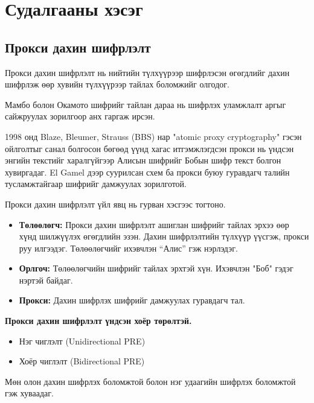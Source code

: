 
\chapter{Судалгааны хэсэг}
\label{Chapter2} %
\pagecolor{white}

\section{Прокси дахин шифрлэлт}
Прокси дахин шифрлэлт нь нийтийн түлхүүрээр шифрлэсэн өгөгдлийг дахин шифрлэж өөр хувийн түлхүүрээр тайлах боломжийг олгодог.

Мамбо болон Окамото шифрийг тайлан дараа нь шифрлэх уламжлалт аргыг сайжруулах зорилгоор анх гаргаж ирсэн.

1998 онд Blaze, Bleumer, Strauss (BBS) нар "atomic proxy cryptography" гэсэн ойлголтыг санал болгосон бөгөөд үүнд хагас итгэмжлэгдсэн прокси нь үндсэн энгийн текстийг харалгүйгээр Алисын шифрийг Бобын шифр текст болгон хувиргадаг. El Gamel дээр суурилсан схем ба прокси буюу гуравдагч талийн тусламжтайгаар шифрийг дамжуулах зорилготой. \cite{ateniese2005improved}

Прокси дахин шифрлэлт үйл явц нь гурван хэсгээс тогтоно.
\begin{itemize}
    \item \textbf{Төлөөлөгч:} Прокси дахин шифрлэлт ашиглан шифрийг тайлах эрхээ өөр хүнд шилжүүлэх өгөгдлийн эзэн. Дахин шифрлэлтийн түлхүүр үүсгэж, прокси руу илгээдэг. Төлөөлөгчийг ихэвчлэн “Алис” гэж нэрлэдэг.
    \item \textbf{Орлгоч:} Төлөөлөгчийн шифрийг тайлах эрхтэй хүн. Ихэвчлэн "Боб" гэдэг нэртэй байдаг.
    \item \textbf{Прокси:} Дахин шифрлэх шифрийг дамжуулах гуравдагч тал.
\end{itemize}

\textbf{Прокси дахин шифрлэлт үндсэн хоёр төрөлтэй.}
\begin{itemize}
    \item Нэг чиглэлт (Unidirectional PRE)
    \item Хоёр чиглэлт (Bidirectional PRE)
\end{itemize}
Мөн олон дахин шифрлэх боломжтой болон нэг удаагийн шифрлэх боломжтой гэж хуваадаг.

